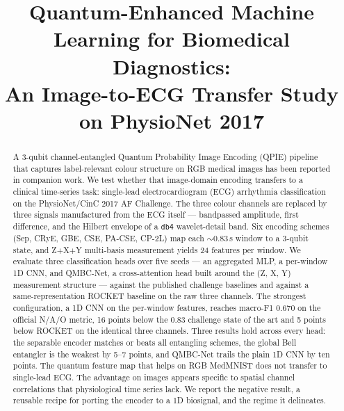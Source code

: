 \documentclass[conference,compsoc]{IEEEtran}
\begin{document}
\title{Quantum-Enhanced Machine Learning for Biomedical Diagnostics:\\An Image-to-ECG Transfer Study on PhysioNet 2017}

\author{
}

\maketitle

\begin{abstract}
A 3-qubit channel-entangled Quantum Probability Image Encoding (QPIE) pipeline that captures label-relevant colour structure on RGB medical images has been reported in companion work. We test whether that image-domain encoding transfers to a clinical time-series task: single-lead electrocardiogram (ECG) arrhythmia classification on the PhysioNet/CinC 2017 AF Challenge. The three colour channels are replaced by three signals manufactured from the ECG itself --- bandpassed amplitude, first difference, and the Hilbert envelope of a \texttt{db4} wavelet-detail band. Six encoding schemes (Sep, CRyE, GBE, CSE, PA-CSE, CP-2L) map each $\sim$0.83\,s window to a 3-qubit state, and Z$+$X$+$Y multi-basis measurement yields 24 features per window. We evaluate three classification heads over five seeds --- an aggregated MLP, a per-window 1D CNN, and QMBC-Net, a cross-attention head built around the (Z, X, Y) measurement structure --- against the published challenge baselines and against a same-representation ROCKET baseline on the raw three channels.
The strongest configuration, a 1D CNN on the per-window features, reaches macro-F1 0.670 on the official N/A/O metric, 16 points below the 0.83 challenge state of the art and 5 points below ROCKET on the identical three channels. Three results hold across every head: the separable encoder matches or beats all entangling schemes, the global Bell entangler is the weakest by 5--7 points, and QMBC-Net trails the plain 1D CNN by ten points. The quantum feature map that helps on RGB MedMNIST does not transfer to single-lead ECG. The advantage on images appears specific to spatial channel correlations that physiological time series lack. We report the negative result, a reusable recipe for porting the encoder to a 1D biosignal, and the regime it delineates.
\end{abstract}
\end{document}
